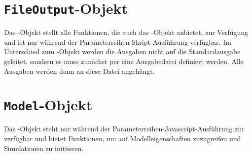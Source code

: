 \chapter{\texttt{FileOutput}-Objekt}

Das -Objekt stellt alle Funktionen, die auch das
-Objekt anbietet, zur Verfügung und ist nur während
der Parameterreihen-Skript-Ausführung verfügbar. Im Unterschied
zum -Objekt werden die Ausgaben nicht auf die Standardausgabe
geleitet, sondern es muss zunächst per 
eine Ausgabedatei definiert werden. Alle Ausgaben werden dann an diese
Datei angehängt.



\chapter{\texttt{Model}-Objekt}

Das -Objekt steht nur während der Parameterreihen-Javascript-Ausführung
zur verfügbar und bietet Funktionen, um auf Modelleigenschaften zuzugreifen und
Simulationen zu initiieren.

